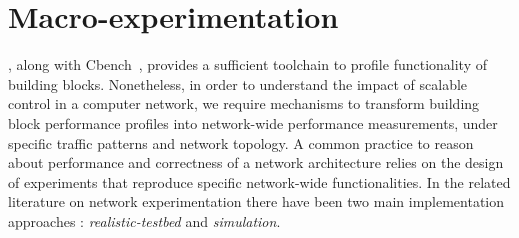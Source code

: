 

\section{\of Macro-experimentation} \label{sec:sdnsim-intro}


\oflops, along with Cbench~\cite{cbench}, provides a sufficient toolchain to
profile functionality of \of building blocks.  Nonetheless, in order to
understand the impact of scalable control in a computer network, we require
mechanisms to transform \of building block performance profiles into network-wide
performance measurements, under specific traffic patterns and network topology.
%
A common practice to reason about performance and correctness of a network
architecture relies on the design of experiments that reproduce specific
network-wide functionalities.  In the related literature on network
experimentation there have been two main implementation approaches : {\it
  realistic-testbed} and {\it simulation}.

